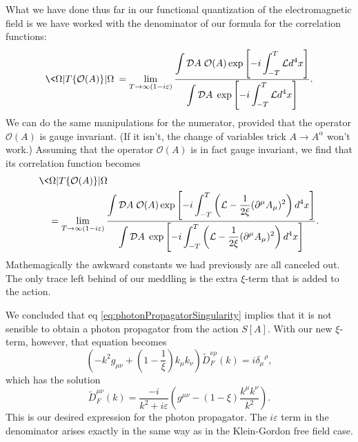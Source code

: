 What we have done thus far in our functional quantization of the
electromagnetic field is we have worked with the denominator of
our formula for the correlation functions:
\begin{equation}%
\<\Omega|T\{\mathcal{O}(A)\}|\Omega\>=\lim_{T\to\infty(1-i\varepsilon)}\frac{\displaystyle\int\mathcal{D}A\;\mathcal{O}(A)\exp\left[-i\int^{T}_{-T}\mathcal{L}d^{4}x\right]}{\displaystyle\int\mathcal{D}A\;\exp\left[-i\int^{T}_{-T}\mathcal{L}d^{4}x\right]}.
\end{equation}
We can do the same manipulations for the numerator, provided that
the operator $\mathcal{O}(A)$ is gauge invariant. (If it isn't,
the change of variables trick $A\to A^{\alpha}$ won't work.)
Assuming that the operator $\mathcal{O}(A)$ is in fact gauge
invariant, we find that its correlation function becomes
\begin{equation}%
\begin{split}
&\<\Omega|T\{\mathcal{O}(A)\}|\Omega\>\\
&\quad = \lim_{T\to\infty(1-i\varepsilon)}
\frac{\displaystyle\int\mathcal{D}A\;\mathcal{O}(A)
\exp\left[-i\int^{T}_{-T}\left(\mathcal{L}-\frac{1}{2\xi}(\partial^{\mu}A_{\mu})^{2}\right)d^{4}x\right]}
{\displaystyle\int\mathcal{D}A\;\exp\left[-i\int^{T}_{-T}\left(\mathcal{L}-\frac{1}{2\xi}(\partial^{\mu}A_{\mu})^{2}\right)d^{4}x\right]}.
\end{split}
\end{equation}
Mathemagically the awkward constants we had previously are all
canceled out. The only trace left behind of our meddling is the
extra $\xi$-term that is added to the action.

We concluded that eq \eqref{eq:photonPropagatorSingularity}
implies that it is not sensible to obtain a photon propagator
from the action $S[A]$. With our new $\xi$-term, however, that
equation becomes
\begin{equation}%
(-k^{2}g_{\mu\nu}+(1-\frac{1}{\xi})k_{\mu}k_{\nu})\tilde{D}^{\nu\rho}_{F}(k)
  = i {\delta_{\mu}}^{\rho},
\end{equation}
which has the solution
\begin{equation}\label{eq:feynmanPropagatorFromFPprocedure}
\tilde{D}^{\mu\nu}_{F}(k) = \frac{-i}{k^{2}+i\varepsilon}\left(g^{\mu\nu}-(1-\xi)\frac{k^{\mu}k^{\nu}}{k^{2}}\right).
\end{equation}
This is our desired expression for the photon propagator. The
$i\varepsilon$ term in the denominator arises exactly in the same
way as in the Klein-Gordon free field case.

